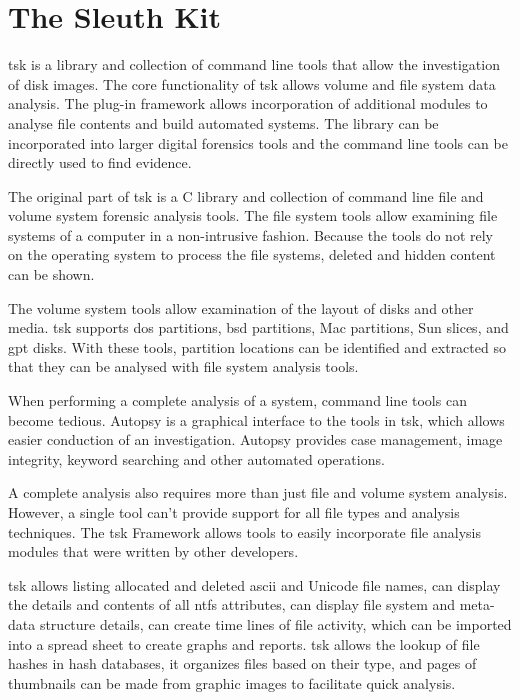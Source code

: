 \section{The Sleuth Kit}

\acrfull{tsk} \cite{sleuthkit} is a library and collection of command line tools that allow the
investigation of disk images. The core functionality of \acrshort{tsk} allows volume and file system data analysis.
The plug-in framework allows incorporation of additional modules to analyse file contents
and build automated systems. The library can be incorporated into larger digital forensics tools and
the command line tools can be directly used to find evidence.

The original part of \acrshort{tsk} is a C \cite{c} library and collection of command line
file and volume system forensic analysis tools. The file system tools allow examining file systems
of a computer in a non-intrusive fashion. Because the tools do not rely on the operating system to process
the file systems, deleted and hidden content can be shown.

The volume system tools allow examination of the layout of disks
and other media. \acrshort{tsk} supports \acrshort{dos} partitions, \acrshort{bsd} partitions, Mac partitions, Sun slices, and 
\acrshort{gpt} \cite{gpt} disks. With these tools, partition locations can be identified 
and extracted so that they can be analysed with file system analysis tools.

When performing a complete analysis of a system, command line 
tools can become tedious. Autopsy \cite{autopsy} is a graphical interface to the tools in \acrshort{tsk}, 
which allows easier conduction of an investigation. Autopsy 
provides case management, image integrity, keyword searching and other automated
operations.

A complete analysis also requires more than just file and volume system analysis.
However, a single tool can't provide support for all file types and analysis 
techniques. The \acrshort{tsk} Framework allows tools to easily incorporate file analysis
modules that were written by other developers.

\acrshort{tsk} allows listing allocated and deleted \acrshort{ascii} and Unicode file names, can display the
details and contents of all \acrshort{ntfs} attributes, can display file system and meta-data structure details,
can create time lines of file activity, which can be imported into a spread sheet to create graphs and reports.
\acrshort{tsk} allows the lookup of file hashes in hash databases, it organizes files based on their type, and pages of
thumbnails can be made from graphic images to facilitate quick analysis.

